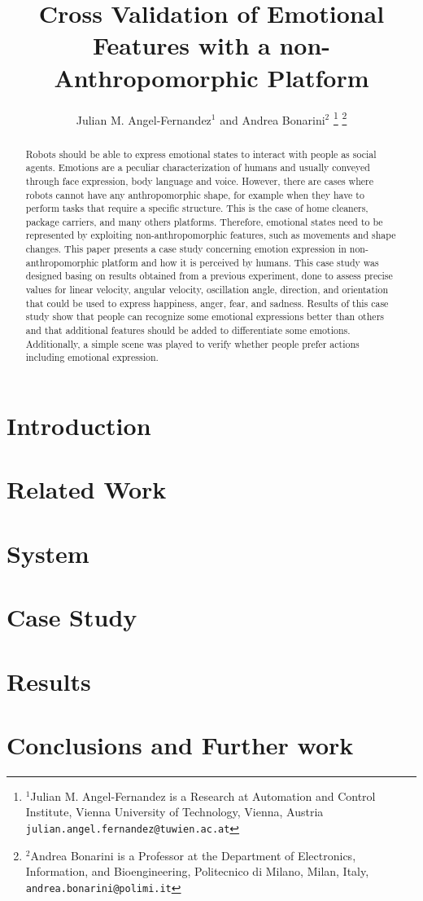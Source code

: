 \documentclass[letterpaper, 10 pt, conference]{ieeeconf}  %
\title{\LARGE \bf
Cross Validation of Emotional Features with a non-Anthropomorphic Platform
}
\author{Julian M. Angel-Fernandez$^{1}$ and Andrea Bonarini$^{2}$%
\thanks{$^{1}$Julian M. Angel-Fernandez is a Research at Automation and Control Institute, Vienna University of Technology, Vienna, Austria
        {\tt\small julian.angel.fernandez@tuwien.ac.at}}%
\thanks{$^{2}$Andrea Bonarini is a Professor at the Department of Electronics, Information, and Bioengineering, Politecnico di Milano, Milan, Italy,
        {\tt\small andrea.bonarini@polimi.it}}%
}
\begin{document}
\maketitle
\thispagestyle{empty}
\pagestyle{empty}


\begin{abstract}
Robots should be able to express emotional states to interact with people as social agents. Emotions are a peculiar characterization of humans and usually conveyed through face expression, body language and voice. However, there are cases where robots cannot have any anthropomorphic shape, for example when they have to perform tasks that require a specific structure. This is the case of home cleaners, package carriers, and many others platforms. Therefore, emotional states need to be represented by exploiting non-anthropomorphic features, such as movements and shape changes. This paper presents a case study concerning emotion expression in non-anthropomorphic platform and how it is perceived by humans. This case study was designed basing on results obtained from a previous experiment, done to assess precise values for linear velocity, angular velocity, oscillation angle, direction, and orientation that could be used to express happiness, anger, fear, and sadness. Results of this case study show that people can recognize some emotional expressions better than others and that additional features should be added to differentiate some emotions. Additionally, a simple scene was played to verify whether people prefer actions including emotional expression. 
\end{abstract}

\section{Introduction}

\section{Related Work}
\label{sec:related_work}

\section{System}
\label{sec:system}

\section{Case Study}
\label{sec:case}

\section{Results}
\label{sec:results}

\section{Conclusions and Further work}




\addtolength{\textheight}{-12cm}
\end{document}
